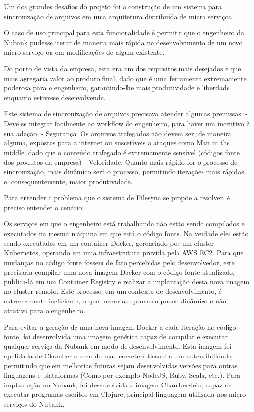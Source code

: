 \documentclass[]{politex}
\begin{document}
	Um dos grandes desafios do projeto foi a construção de um sistema para sincronização de arquivos em uma arquitetura distribuída de micro serviços.
	
	O caso de uso principal para esta funcionalidade é permitir que o engenheiro da Nubank pudesse iterar de maneira mais rápida no desenvolvimento de um novo micro serviço ou em modificações de algum existente.
	
	Do ponto de vista da empresa, esta era um dos requisitos mais desejados e que mais agregaria valor ao produto final, dado que é uma ferramenta extremamente poderosa para o engenheiro, garantindo-lhe mais produtividade e liberdade enquanto estivesse desenvolvendo.
	
	Este sistema de sincronização de arquivos precisava atender algumas premissas:
	- Deve se integrar facilmente ao workflow do engenheiro, para haver um incentivo à sua adoção.
	- Segurança: Os arquivos trafegados não devem ser, de maneira alguma, expostos para a internet ou suscetíveis a ataques como Man in the middle, dado que o conteúdo trafegado é extremamente sensível (códigos fonte dos produtos da empresa)
	- Velocidade: Quanto mais rápido for o processo de sincronização, mais dinâmico será o processo, permitindo iterações mais rápidas e, consequentemente, maior produtividade.

	Para entender o problema que o sistema de Filesync se propõe a resolver, é preciso entender o cenário:
	
	Os serviços em que o engenheiro está trabalhando não estão sendo compilados e executados na mesma máquina em que está o código fonte. Na verdade eles estão sendo executados em um container Docker, gerenciado por um cluster Kubernetes, operando em uma infraestrutura provida pela AWS EC2. Para que mudanças no código fonte fossem de fato percebidas pelo desenvolvedor, este precisaria compilar uma nova imagem Docker com o código fonte atualizado, publica-lá em um Container Registry e realizar a implantação desta nova imagem no cluster remoto. Este processo, em um contexto de desenvolvimento, é extremamente ineficiente, o que tornaria o processo pouco dinâmico e não atrativo para o engenheiro.

	Para evitar a geração de uma nova imagem Docker a cada iteração no código fonte, foi desenvolvida uma imagem genérica capaz de compilar e executar qualquer serviço da Nubank em modo de desenvolvimento. Esta imagem foi apelidada de Chamber e uma de suas características é a sua extensibilidade, permitindo que em melhorias futuras sejam desenvolvidas versões para outras linguagens e plataformas (Como por exemplo NodeJS, Ruby, Scala, etc.). Para implantação no Nubank, foi desenvolvida a imagem Chamber-lein, capaz de executar programas escritos em Clojure, principal linguagem utilizada nos micro serviços do Nubank.
\end{document}
